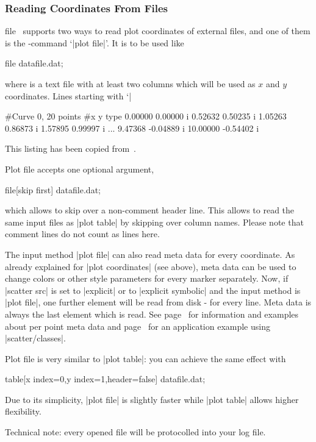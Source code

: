 \subsubsection{Reading Coordinates From Files}

\begin{addplotoperation}[]{file}{}
\label{pgfplots:addplot:file}
\PGFPlots\ supports two ways to read plot coordinates of external files, and one of them is the \Tikz-command `|plot file|'. It is to be used like
\begin{codeexample}
\addplot file {datafile.dat};
\end{codeexample}
where  is a text file with at least two columns which will be used as $x$ and $y$ coordinates. Lines starting with `|%
\begin{codeexample}
#Curve 0, 20 points
#x y type
0.00000 0.00000 i
0.52632 0.50235 i
1.05263 0.86873 i
1.57895 0.99997 i
...
9.47368 -0.04889 i
10.00000 -0.54402 i
\end{codeexample}
This listing has been copied from~\cite[section~16.4]{tikz}.

Plot file accepts one optional argument,

\begin{codeexample}
\addplot file[skip first] {datafile.dat};
\end{codeexample}

\noindent
which allows to skip over a non-comment header line. This allows to read the same input files as |plot table| by skipping over column names. Please note that comment lines do not count as lines here.

The input method |plot file| can also read meta data for every coordinate. As already explained for |plot coordinates| (see above), meta data can be used to change colors or other style parameters for every marker separately. Now, if |scatter src| is set to |explicit| or to |explicit symbolic| and the input method is |plot file|, one further element will be read from disk - for every line. Meta data is always the last element which is read. See page~\pageref{pgfplots:scatter:src} for information and examples about per point meta data and page~\pageref{pgfplots:scatterclasses} for an application example using |scatter/classes|.


Plot file is very similar to |plot table|: you can achieve the same effect with
\begin{codeexample}
\addplot table[x index=0,y index=1,header=false] {datafile.dat};
\end{codeexample}
\noindent Due to its simplicity, |plot file| is slightly faster while |plot table| allows higher flexibility.

Technical note: every opened file will be protocolled into your log file.
\end{addplotoperation}

